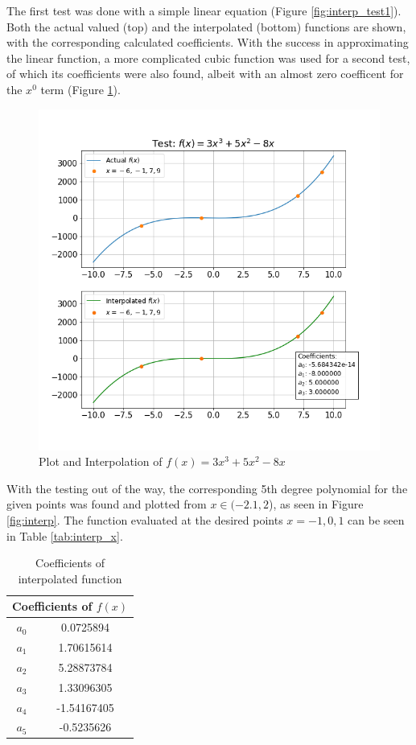 \documentclass[twocolumn]{article}
\begin{document}
The first test was done with a simple linear equation (Figure \ref{fig:interp_test1}). Both the actual valued (top)
and the interpolated (bottom) functions are shown, with the corresponding calculated coefficients. With the success in
approximating the linear function, a more complicated cubic function was used for a second test, of which its
coefficients were also found, albeit with an almost zero coefficent for the $x^0$ term (Figure \ref{fig:interp_test2}).
\begin{figure}[h!]
 \centering
 \includegraphics[scale = 0.4]{interp_test2}
 \caption{Plot and Interpolation of $f(x)=3x^3 + 5x^2 - 8x$}
 \label{fig:interp_test2}
\end{figure}
\vfill\eject
With the testing out of the way, the corresponding 5th degree polynomial for the given points was found and plotted from $x\in(-2.1, 2$), as
seen in Figure \ref{fig:interp}. The function evaluated at the desired points $x = -1, 0, 1$ can be seen in Table \ref{tab:interp_x}.
\begin{table}[h!]
 \centering
 \begin{tabular}{|c|c|}
 \hline
 \multicolumn{2}{|c|}{\textbf{Coefficients of $f(x)$}} \\
 \hline
 $a_0$ &  0.0725894\\
 $a_1$ & 1.70615614\\
 $a_2$ & 5.28873784\\
 $a_3$ & 1.33096305\\
 $a_4$ & -1.54167405\\
 $a_5$ & -0.5235626\\
 \hline
 \end{tabular}
 \caption{Coefficients of interpolated function}
 \label{tab:interp_coeff}
\end{table}
\end{document}
